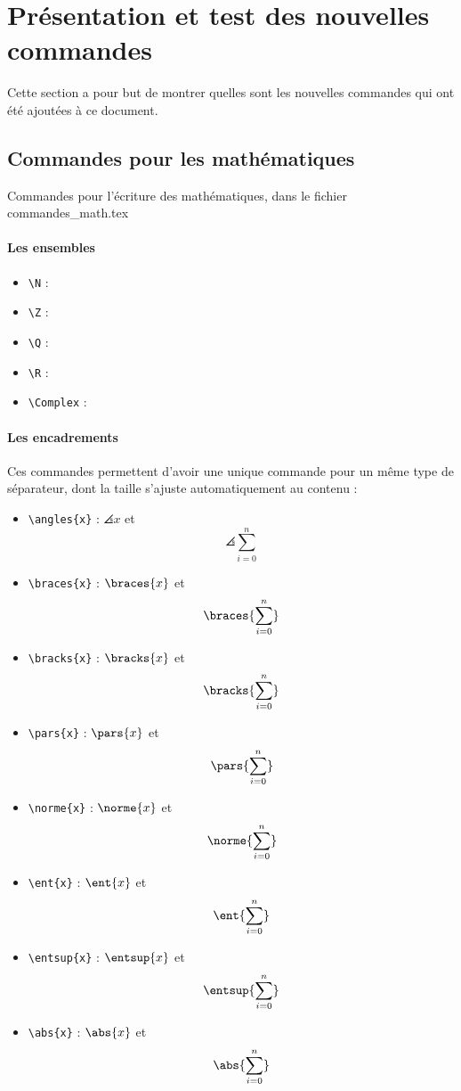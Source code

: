 \section*{Présentation et test des nouvelles commandes}

Cette section a pour but de montrer quelles sont les nouvelles commandes qui ont été ajoutées à ce document.

\subsection*{Commandes pour les mathématiques}
Commandes pour l'écriture des mathématiques, dans le fichier commandes\_math.tex

\paragraph{Les ensembles} 
\begin{itemize}
    \item \verb=\N=  : \N
    \item \verb=\Z= : \Z
    \item \verb=\Q= : \Q
    \item \verb=\R= : \R
    \item \verb=\Complex= : \Complex
\end{itemize}


\paragraph{Les encadrements} Ces commandes permettent d'avoir une unique commande pour un même type de séparateur, dont la taille s'ajuste automatiquement au contenu : 
\begin{itemize}
    \item \verb=\angles{x}= : $\angles{x}$ et $$\angles{\sum_{i = 0}^{n}}$$
    \item \verb=\braces{x}= : $\braces{x}$ et $$\braces{\sum_{i = 0}^{n}}$$
    \item \verb=\bracks{x}= : $\bracks{x}$ et $$\bracks{\sum_{i = 0}^{n}}$$
    \item \verb=\pars{x}= : $\pars{x}$ et $$\pars{\sum_{i = 0}^{n}}$$
    \item \verb=\norme{x}= : $\norme{x}$ et $$\norme{\sum_{i = 0}^{n}}$$
    \item \verb=\ent{x}= : $\ent{x}$ et $$\ent{\sum_{i = 0}^{n}}$$
    \item \verb=\entsup{x}= : $\entsup{x}$ et $$\entsup{\sum_{i = 0}^{n}}$$
    \item \verb=\abs{x}= : $\abs{x}$ et $$\abs{\sum_{i = 0}^{n}}$$
\end{itemize}

